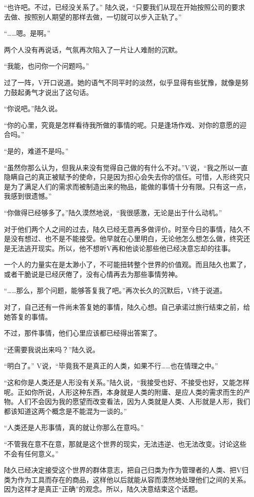 “也许吧。不过，已经没关系了。” 陆久说，“只要我们从现在开始按照公司的要求去做、按照别人期望的那样去做，一切就可以步入正轨了。”

“……嗯。是啊。”

两个人没有再说话，气氛再次陷入了一片让人难耐的沉默。

“我能，也问你一个问题吗。”

过了一阵，V开口说道。她的语气不同平时的淡然，似乎显得有些犹豫，就像是努力鼓起勇气才说出了这句话。

“你说吧。”陆久说。

“你的心里，究竟是怎样看待我所做的事情的呢。只是逢场作戏、对你的意愿的迎合吗。” 

“是的，难道不是吗。” 

“虽然你那么认为，但我从来没有觉得自己做的有什么不对。”V说，“我之所以一直隐瞒自己的真正被赋予的使命，只是因为担心会失去你的信任。可惜，人形终究只是为了满足人们的需求而被制造出来的物品，能做的事情十分有限。只有这一点，我感到很遗憾。”

“你做得已经够多了。”陆久漠然地说，“我很感激，无论是出于什么动机。”

对于他们两个人之间的过去，陆久已经无意再多做评价。时至今日的事情，陆久不是没有想过、也不是不能接受。他早就在心里明白，无论他怎么想怎么做，终究还是无法逃开现实。所以，他不想听V再和他谈论那些他已经决意忘却的往事。

一个人的力量实在是太渺小了，不可能扭转整个世界的价值观。而且陆久也累了，或者干脆说是已经厌倦了，没有心情再去为那些事情劳神。

“……那么，那个问题，能够答复我了吧。”再次长久的沉默后，V终于说道。

对了，自己还有一件尚未答复她的事情，陆久心想。自己承诺过旅行结束之前，给她答复的事情。

不过，那件事情，他们心里应该都已经得出答案了。

“还需要我说出来吗？”陆久说。

“明白了。” V说，“毕竟我不是真正的人类，如果不行……也在情理之中。” 

“这和你是人类还是人形没有关系。”陆久说，“我接受也好、不接受也好，又能怎样呢。正如你所说，人形这种东西，本身就是人类的附庸、是应人类的需求而生的产物。人们不会因为我的愿望而改变看法，因为人类就是人类、人形就是人形，我们都该知道这两个概念是不能混为一谈的。”

“人类还是人形事情，真的就让你那么在意吗。”

“不管我在意不在意，那就是这个世界的现实，无法违逆、也无法改变。讨论这些不会有任何意义。”

陆久已经决定接受这个世界的群体意志，把自己归类为作为管理者的人类、把V归类为作为工具而存在的商品，这样他以后就能从容而漠然地处理他们之间的关系。因为这样才是真正“正确”的观念。所以，陆久决意结束这个话题。

